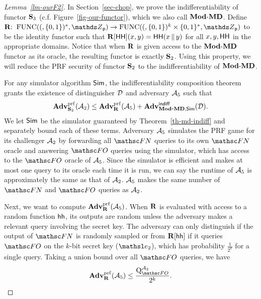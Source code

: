 \begin{proof}[Lemma~\ref{lm-ourF2}]
	In Section~\ref{sec-chop}, we prove the indifferentiability of functor $\mathbf{S}_3$ (c.f. Figure~\ref{fig-our-functor}), which we also call $\mathbf{Mod\mbox{-}MD}$.
	Define $\construct{R}\Colon\AllFuncs(\bits^*,\Z_{\Prime})\to \AllFuncs(\bits^k \times \bits^*,\Z_{\Prime})$ to be the identity functor such that $\mathbf{R}[\mathsf{HH}](x, y)=\mathsf{HH}(x {\,\|\,} y)$ for all $x, y, \mathsf{HH}$ in the appropriate domains.
	Notice that when $\mathbf{R}$ is given access to the $\mathbf{Mod\mbox{-}MD}$ functor as its oracle, the resulting functor is exactly $\mathbf{S}_2$. 
	Using this property, we will reduce the PRF security of functor $\mathbf{S}_2$ to the indifferentiability of $\mathbf{Mod\mbox{-}MD}$.

	For any simulator algorithm $\mathsf{Sim}$, the indifferentiability composition theorem~\cite{TCC:MauRenHol04} grants the existence of distinguisher $\mathcal{D}$ and adversary $\mathcal{A}_5$ such that
	\[
	\mathbf{Adv}^{\mathrm{prf}}_{\mathbf{S}_2}(\mathcal{A}_2) \leq \mathbf{Adv}^{\mathrm{prf}}_{\mathbf{R}}(\mathcal{A}_5)+ \mathbf{Adv}^{\mathrm{\mathsf{indiff}}}_{\mathbf{Mod\mbox{-}MD}, \mathsf{Sim}}(\mathcal{D}).
	\]
	We let $\mathsf{Sim}$ be the simulator guaranteed by Theorem~\ref{th-md-indiff} and separately bound each of these terms.
	Adversary $\mathcal{A}_5$ simulates the PRF game for its challenger $\mathcal{A}_2$ by forwarding all $\FUNCO$ queries to its own $\FUNCO$ oracle and
	answering $\HASH$ queries using the simulator, which has access to the $\HASH$ oracle of $\mathcal{A}_5$.
	Since the simulator is efficient and makes at most one query to its oracle each time it is run, we can say the runtime of $\mathcal{A}_5$ is approximately the same as that of $\mathcal{A}_2$.
	$\mathcal{A}_5$ makes the same number of $\FUNCO$ and $\HASH$ queries as $\mathcal{A}_2$. 

	Next, we want to compute $\mathbf{Adv}^{\mathrm{prf}}_{\mathbf{R}}(\mathcal{A}_5)$. When $\mathbf{R}$ is evaluated with access to a random function $\mathsf{hh}$, its outputs are random unless the adversary makes a relevant query involving the secret key.
	The adversary can only distinguish if the output of $\FUNCO$ is randomly sampled or from $\mathbf{R}[\mathsf{hh}]$ if it queries $\HASH$ on the $k$-bit secret key ($\eEDSA_2$), which has probability $\frac{1}{2^{k}}$ for a single query. 
	Taking a union bound over all $\HASH$ queries, we have
	$$\prfAdv{\construct{R}}{\advA_5} \leq \frac{\Queries{\HASH}{\advA_{2}}}{2^{k}}.$$


\end{proof}
